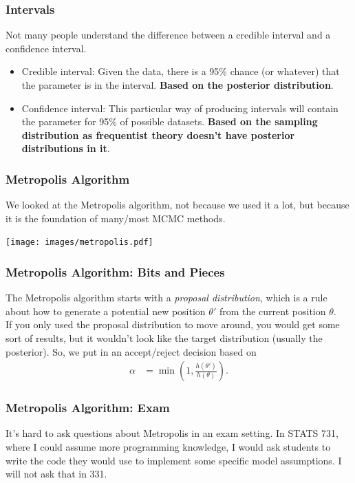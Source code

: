 \documentclass{beamer}
\begin{document}
\begin{frame}
\frametitle{Intervals}
Not many people understand the difference between a credible interval and
a confidence interval.\pause

\begin{itemize}
\item Credible interval: Given the data, there is a 95\% chance (or whatever)
that the parameter is in the interval. {\bf Based on the posterior distribution}.\pause
\item Confidence interval: This particular way of producing intervals will
contain the parameter for 95\% of possible datasets.
{\bf Based on the sampling distribution as frequentist theory doesn't have
posterior distributions in it}.
\end{itemize}

\end{frame}


\begin{frame}
\frametitle{Metropolis Algorithm}

We looked at the Metropolis algorithm, not because we used it a lot, but because
it is the foundation of many/most MCMC methods.

\centering
\texttt{[image: images/metropolis.pdf]}

\end{frame}

\begin{frame}
\frametitle{Metropolis Algorithm: Bits and Pieces}
The Metropolis algorithm starts with a {\em proposal distribution}, which
is a rule about how to generate a potential new position $\theta'$ from the
current position $\theta$.\pause\\[0.5em]

If you only used the proposal distribution to move around, you would get
some sort of results, but it wouldn't look like the target distribution
(usually the posterior). So, we put in an accept/reject decision based on
\begin{align}
\alpha &= \min\left(1, \frac{h(\theta')}{h(\theta)}\right).
\end{align}

\end{frame}


\begin{frame}
\frametitle{Metropolis Algorithm: Exam}
It's hard to ask questions about Metropolis in an exam setting. In STATS 731,
where I could assume more programming knowledge, I would ask students to write
the code they would use to implement some specific model assumptions.
I will not ask that in 331.


\end{frame}
\end{document}

